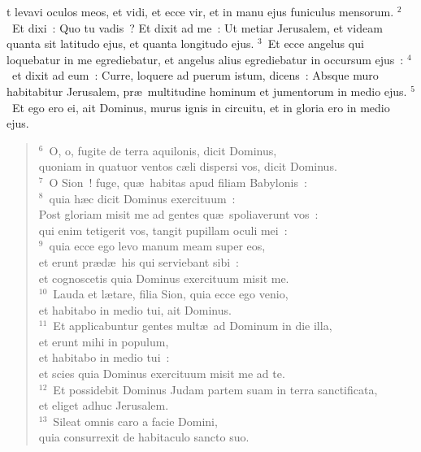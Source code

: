 \bchapter
{}t levavi oculos meos, et vidi, et ecce vir, et in manu ejus funiculus mensorum.
${}^{2}$~Et dixi~: Quo tu vadis~? Et dixit ad me~: Ut metiar Jerusalem, et videam quanta sit latitudo ejus, et quanta longitudo ejus.
${}^{3}$~Et ecce angelus qui loquebatur in me egrediebatur, et angelus alius egrediebatur in occursum ejus~:
${}^{4}$~et dixit ad eum~: Curre, loquere ad puerum istum, dicens~: Absque muro habitabitur Jerusalem, pr\ae\ multitudine hominum et jumentorum in medio ejus.
${}^{5}$~Et ego ero ei, ait Dominus, murus ignis in circuitu, et in gloria ero in medio ejus.
\begin{verse}${}^{6}$~O, o, fugite de terra aquilonis, dicit Dominus,\\ quoniam in quatuor ventos c\ae li dispersi vos, dicit Dominus.\\
${}^{7}$~O Sion~! fuge, qu\ae\ habitas apud filiam Babylonis~:\\
${}^{8}$~quia h\ae c dicit Dominus exercituum~:\\ Post gloriam misit me ad gentes qu\ae\ spoliaverunt vos~:\\ qui enim tetigerit vos, tangit pupillam oculi mei~:\\
${}^{9}$~quia ecce ego levo manum meam super eos,\\ et erunt pr\ae d\ae\ his qui serviebant sibi~:\\ et cognoscetis quia Dominus exercituum misit me.\\
${}^{10}$~Lauda et l\ae tare, filia Sion, quia ecce ego venio,\\ et habitabo in medio tui, ait Dominus.\\
${}^{11}$~Et applicabuntur gentes mult\ae\ ad Dominum in die illa,\\ et erunt mihi in populum,\\ et habitabo in medio tui~:\\ et scies quia Dominus exercituum misit me ad te.\\
${}^{12}$~Et possidebit Dominus Judam partem suam in terra sanctificata,\\ et eliget adhuc Jerusalem.\\
${}^{13}$~Sileat omnis caro a facie Domini,\\ quia consurrexit de habitaculo sancto suo.\end{verse}




